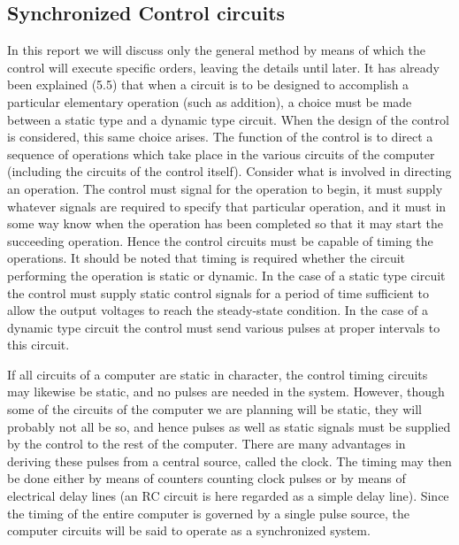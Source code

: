 \documentclass[12pt]{amsart}
\begin{document}
\subsection{Synchronized Control circuits}
In this report we will discuss only the general method by means of which the control will execute specific orders, leaving the details until later. It has already been explained (5.5) that when a circuit is to be designed to accomplish a particular elementary operation (such as addition), a choice must be made between a static type and a dynamic type circuit. When the design of the control is considered, this same choice arises. The function of the control is to direct a sequence of operations which take place in the various circuits of the computer (including the circuits of the control itself). Consider what is involved in directing an operation. The control must signal for the operation to begin, it must supply whatever signals are required to specify that particular operation, and it must in some way know when the operation has been completed so that it may start the succeeding operation. Hence the control circuits must be capable of timing the operations. It should be noted that timing is required whether the circuit performing the operation is static or dynamic. In the case of a static type circuit the control must supply static control signals for a period of time sufficient to allow the output voltages to reach the steady-state condition. In the case of a dynamic type circuit the control must send various pulses at proper intervals to this circuit.

If all circuits of a computer are static in character, the control timing circuits may likewise be static, and no pulses are needed in the system. However, though some of the circuits of the computer we are planning will be static, they will probably not all be so, and hence pulses as well as static signals must be supplied by the control to the rest of the computer. There are many advantages in deriving these pulses from a central source, called the clock. The timing may then be done either by means of counters counting clock pulses or by means of electrical delay lines (an RC circuit is here regarded as a simple delay line). Since the timing of the entire computer is governed by a single pulse source, the computer circuits will be said to operate as a synchronized system.
\end{document}
